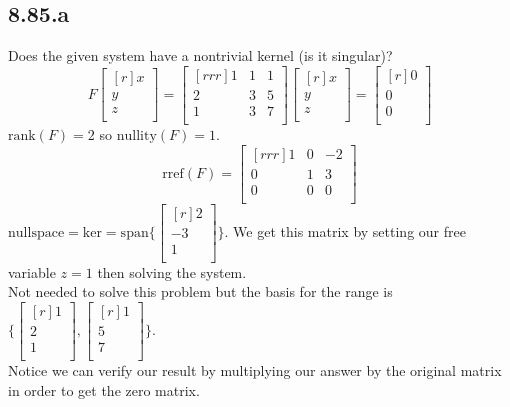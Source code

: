 \documentclass{report}
\begin{document}
\subsection{8.85.a}
Does the given system have a nontrivial kernel (is it singular)?
\[ F\begin{bmatrix}[r]x\\y\\z\\\end{bmatrix} = \begin{bmatrix}[rrr]1&1&1\\2&3&5\\1&3&7\\\end{bmatrix}\begin{bmatrix}[r]x\\y\\z\\\end{bmatrix} = \begin{bmatrix}[r]0\\0\\0\\\end{bmatrix} \]
$\mathrm{rank}(F)=2$ so $\mathrm{nullity}(F)=1$.
\[ \mathrm{rref}(F)=\begin{bmatrix}[rrr]1&0&-2\\0&1&3\\0&0&0\\\end{bmatrix} \]
$\mathrm{nullspace}=\mathrm{ker}=\mathrm{span}\{\begin{bmatrix}[r]2\\-3\\1\\\end{bmatrix}\}$. We get this matrix by setting our free variable $z=1$ then solving the system.\\
Not needed to solve this problem but the basis for the range is $\{\begin{bmatrix}[r]1\\2\\1\\\end{bmatrix},\begin{bmatrix}[r]1\\5\\7\\\end{bmatrix}\}$.\\
Notice we can verify our result by multiplying our answer by the original matrix in order to get the zero matrix.
\end{document}
